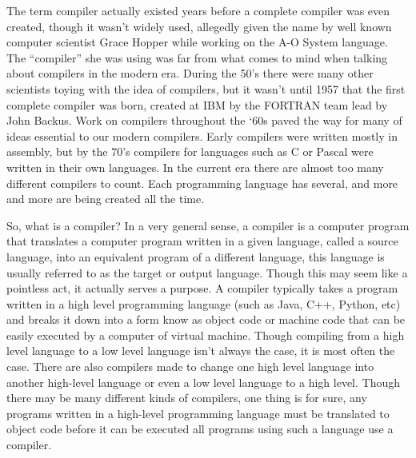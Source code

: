 \documentclass[12pt, oneside]{article}   	%
\begin{document}
The term compiler actually existed years before a complete compiler was
even created, though it wasn’t widely used, allegedly given the name by well
known computer scientist Grace Hopper while working on the A-O System
language. The “compiler” she was using was far from what comes to mind when
talking about compilers in the modern era. During the 50’s there were many other
scientists toying with the idea of compilers, but it wasn’t until 1957 that the first
complete compiler was born, created at IBM by the FORTRAN team lead by
John Backus. Work on compilers throughout the ‘60s paved the way for many of
ideas essential to our modern compilers. Early compilers were written mostly in
assembly, but by the 70’s compilers for languages such as C or Pascal were
written in their own languages. In the current era there are almost too many
different compilers to count. Each programming language has several, and more
and more are being created all the time.

So, what is a compiler? In a very general sense, a compiler is a computer
program that translates a computer program written in a given language, called a
source language, into an equivalent program of a different language, this
language is usually referred to as the target or output language. Though this may
seem like a pointless act, it actually serves a purpose. A compiler typically takes
a program written in a high level programming language (such as Java, C++,
Python, etc) and breaks it down into a form know as object code or machine code
that can be easily executed by a computer of virtual machine. Though compiling
from a high level language to a low level language isn’t always the case, it is
most often the case. There are also compilers made to change one high level
language into another high-level language or even a low level language to a high
level. Though there may be many different kinds of compilers, one thing is for
sure, any programs written in a high-level programming language must be
translated to object code before it can be executed all programs using such a
language use a compiler.
\end{document}
